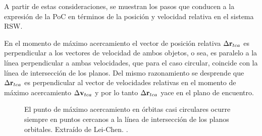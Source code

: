 A partir de estas consideraciones, se muestran los pasos que conducen a la expresi\'on de la PoC en t\'erminos de la posici\'on y velocidad relativa en el sistema RSW. 
 
En el momento de m\'aximo acercamiento el vector de posici\'on relativa $\Delta {\bf{r}}_{tca}$ es perpendicular a los vectores de velocidad de ambos objetos, o sea, es paralelo a la l\'inea perpendicular a ambas velocidades, que para el caso circular, coincide con la l\'inea de intersecci\'on de los planos. Del mismo razonamiento se desprende que $\Delta {\bf{r}}_{tca}$ es perpendicular al vector de velocidades relativas en el momento de m\'aximo acercamiento $\Delta {\bf{v}}_{tca}$ y por lo tanto $\Delta {\bf{r}}_{tca}$ yace en el plano de encuentro. 


\begin{figure}[!h]
\begin{minipage}[t]{0.48\textwidth}
 \centering
 \caption[M\'aximo acercamiento en \'orbitas circulares]{El punto de m\'aximo acercamiento en \'orbitas casi circulares ocurre siempre en puntos cercanos a la l\'inea de intersecci\'on de los planos orbitales. Extra\'ido de Lei-Chen. \citep{leichen}.}
 \label{fig:pocorbcirc}
\end{minipage}
\begin{minipage}[t]{0.48\textwidth}
 \centering

\end{minipage}
\end{figure}
